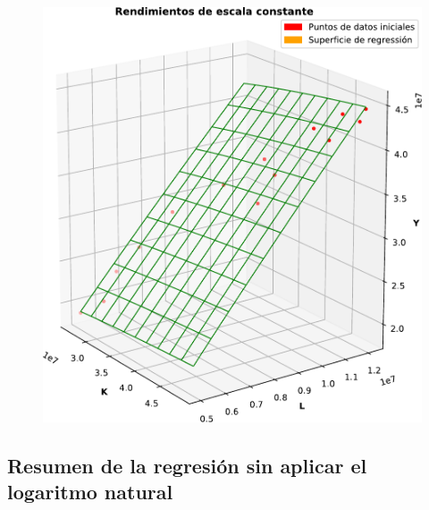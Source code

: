 \documentclass{sciposter}
\begin{document}
\begin{multicols*}{2}
\begin{figure}[ht!]
	\centering
	\includegraphics[width=0.25\paperwidth]{withnaturalog.pdf}
	\label{fig:log}
\end{figure}

\subsection*{Resumen de la regresión sin aplicar el logaritmo natural}



\end{multicols*}
\end{document}
